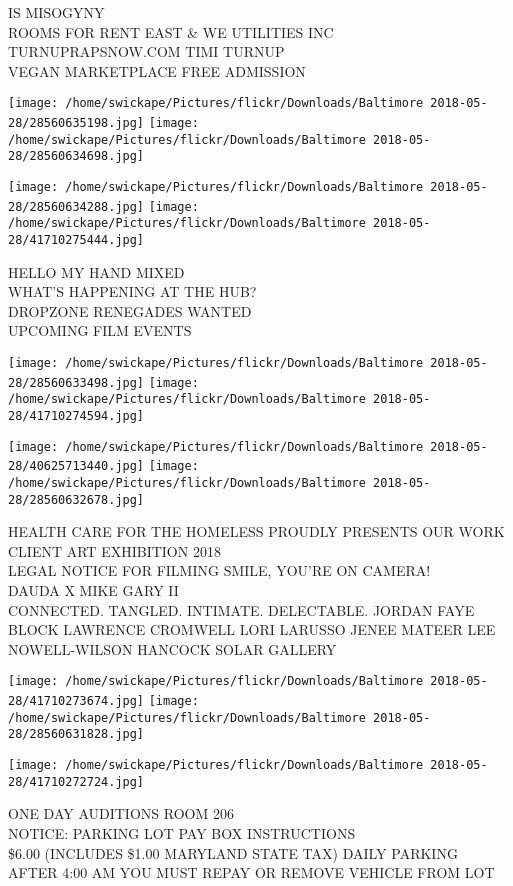 \documentclass[10pt,letterpaper]{article}
\begin{document}
IS MISOGYNY\\
ROOMS FOR RENT EAST \& WE UTILITIES INC\\
TURNUPRAPSNOW.COM TIMI TURNUP\\
VEGAN MARKETPLACE FREE ADMISSION
\pagebreak

\texttt{[image: /home/swickape/Pictures/flickr/Downloads/Baltimore 2018-05-28/28560635198.jpg]}
\texttt{[image: /home/swickape/Pictures/flickr/Downloads/Baltimore 2018-05-28/28560634698.jpg]}

\texttt{[image: /home/swickape/Pictures/flickr/Downloads/Baltimore 2018-05-28/28560634288.jpg]}
\texttt{[image: /home/swickape/Pictures/flickr/Downloads/Baltimore 2018-05-28/41710275444.jpg]}

HELLO MY HAND MIXED\\
WHAT'S HAPPENING AT THE HUB?\\
DROPZONE RENEGADES WANTED\\
UPCOMING FILM EVENTS
\pagebreak

\texttt{[image: /home/swickape/Pictures/flickr/Downloads/Baltimore 2018-05-28/28560633498.jpg]}
\texttt{[image: /home/swickape/Pictures/flickr/Downloads/Baltimore 2018-05-28/41710274594.jpg]}

\texttt{[image: /home/swickape/Pictures/flickr/Downloads/Baltimore 2018-05-28/40625713440.jpg]}
\texttt{[image: /home/swickape/Pictures/flickr/Downloads/Baltimore 2018-05-28/28560632678.jpg]}

HEALTH CARE FOR THE HOMELESS PROUDLY PRESENTS OUR WORK CLIENT ART EXHIBITION 2018\\
LEGAL NOTICE FOR FILMING SMILE, YOU'RE ON CAMERA!\\
DAUDA X MIKE GARY II\\
CONNECTED.  TANGLED.  INTIMATE.  DELECTABLE.  JORDAN FAYE BLOCK LAWRENCE CROMWELL LORI LARUSSO JENEE MATEER LEE NOWELL{-}WILSON HANCOCK SOLAR GALLERY
\pagebreak

\texttt{[image: /home/swickape/Pictures/flickr/Downloads/Baltimore 2018-05-28/41710273674.jpg]}
\texttt{[image: /home/swickape/Pictures/flickr/Downloads/Baltimore 2018-05-28/28560631828.jpg]}

\texttt{[image: /home/swickape/Pictures/flickr/Downloads/Baltimore 2018-05-28/41710272724.jpg]}

ONE DAY AUDITIONS ROOM 206\\
NOTICE: PARKING LOT PAY BOX INSTRUCTIONS\\
\$6.00 (INCLUDES \$1.00 MARYLAND STATE TAX) DAILY PARKING AFTER 4:00 AM YOU MUST REPAY OR REMOVE VEHICLE FROM LOT
\pagebreak
\end{document}
